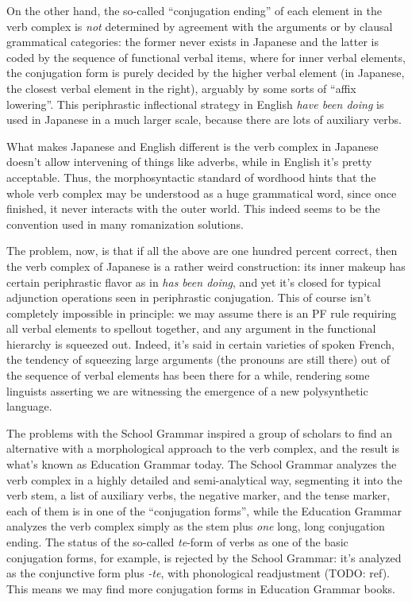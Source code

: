 \documentclass[UTF8, a4paper, oneside, scheme=plain]{ctexart}
\newcommand{\corpus}[1]{\emph{#1}}
\begin{document}
On the other hand, the so-called ``conjugation ending'' of each element in the verb complex 
is \emph{not} determined by agreement with the arguments 
or by clausal grammatical categories:
the former never exists in Japanese and the latter is coded by the sequence of functional verbal items,
where for inner verbal elements,
the conjugation form is purely decided 
by the higher verbal element (in Japanese, the closest verbal element in the right), 
arguably by some sorts of ``affix lowering''.
This periphrastic inflectional strategy in English \corpus{have been doing} 
is used in Japanese in a much larger scale,
because there are lots of auxiliary verbs.

What makes Japanese and English different 
is the verb complex in Japanese doesn't allow intervening of things like adverbs,
while in English it's pretty acceptable.
Thus, the morphosyntactic standard of wordhood hints that 
the whole verb complex may be understood as a huge grammatical word,
since once finished, it never interacts with the outer world.
This indeed seems to be the convention used in many romanization solutions.

The problem, now, is that if all the above are one hundred percent correct,
then the verb complex of Japanese is a rather weird construction:
its inner makeup has certain periphrastic flavor as in \corpus{has been doing},
and yet it's closed for typical adjunction operations seen in periphrastic conjugation.
This of course isn't completely impossible in principle:
we may assume there is an PF rule requiring all verbal elements to spellout together,
and any argument in the functional hierarchy is squeezed out.
Indeed, it's said in certain varieties of spoken French, 
the tendency of squeezing large arguments (the pronouns are still there) 
out of the sequence of verbal elements 
has been there for a while,
rendering some linguists asserting we are witnessing the emergence of a new polysynthetic language.

The problems with the School Grammar
inspired a group of scholars to find an alternative with a morphological approach to the verb complex,
and the result is what's known as Education Grammar today.
The School Grammar analyzes the verb complex in a highly detailed and semi-analytical way,
segmenting it into the verb stem, a list of auxiliary verbs, the negative marker, and the tense marker,
each of them is in one of the ``conjugation forms'',
while the Education Grammar analyzes the verb complex 
simply as the stem plus \emph{one} long, long conjugation ending.
The status of the so-called \corpus{te}-form of verbs as one of the basic conjugation forms, for example,
is rejected by the School Grammar:
it's analyzed as the conjunctive form plus \corpus{-te},
with phonological readjustment (TODO: ref).
This means we may find more conjugation forms in Education Grammar books.
\end{document}
